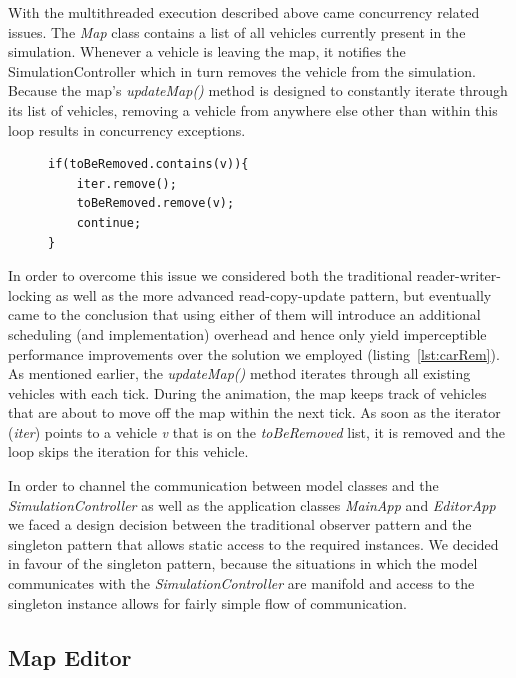 With the multithreaded execution described above came concurrency related issues. The \textit{Map} class contains a list of all vehicles currently present in the simulation. Whenever a vehicle is leaving the map, it notifies the SimulationController which in turn removes the vehicle from the simulation. Because the map's \textit{updateMap()} method is designed to constantly iterate through its list of vehicles, removing a vehicle from anywhere else other than within this loop results in concurrency exceptions.

\begin{figure}
	\begin{minipage}{0.45\textwidth}
		\begin{lstlisting}[caption={Car Removal}, label={lst:carRem}]
if(toBeRemoved.contains(v)){
	iter.remove();
	toBeRemoved.remove(v);
	continue;
}	
		\end{lstlisting}
	\end{minipage}
\end{figure}

In order to overcome this issue we considered both the traditional reader-writer-locking as well as the more advanced read-copy-update pattern, but eventually came to the conclusion that using either of them will introduce an additional scheduling (and implementation) overhead and hence only yield imperceptible performance improvements over the solution we employed (listing~\ref{lst:carRem}). As mentioned earlier, the \textit{updateMap()} method iterates through all existing vehicles with each tick. During the animation, the map keeps track of vehicles that are about to move off the map within the next tick. As soon as the iterator (\textit{iter}) points to a vehicle \textit{v} that is on the \textit{toBeRemoved} list, it is removed and the loop skips the iteration for this vehicle.

In order to channel the communication between model classes and the \textit{SimulationController} as well as the application classes \textit{MainApp} and \textit{EditorApp} we faced a design decision between the traditional observer pattern and the singleton pattern that allows static access to the required instances. We decided in favour of the singleton pattern, because the situations in which the model communicates with the \textit{SimulationController} are manifold and access to the singleton instance allows for fairly simple flow of communication.

\subsection{Map Editor}

